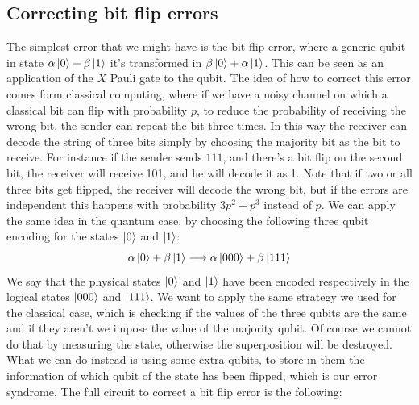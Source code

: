 \documentclass{article}
\begin{document}
	\subsection{Correcting bit flip errors}
	The simplest error that we might have is the bit flip error, where a generic qubit in state $\alpha\ket{0} + \beta\ket{1}$ it's transformed in $\beta\ket{0} + \alpha\ket{1}$. This can be seen as an application of the $X$ Pauli gate to the qubit. The idea of how to correct this error comes form classical computing, where if we have a noisy channel on which a classical bit can flip with probability $p$, to reduce the probability of receiving the wrong bit, the sender can repeat the bit three times. In this way the receiver can decode the string of three bits simply by choosing the majority bit as the bit to receive. For instance if the sender sends $111$, and there's a bit flip on the second bit, the receiver will receive 101, and he will decode it as 1. Note that if two or all three bits get flipped, the receiver will decode the wrong bit, but if the errors are independent this happens with probability $3p^2 + p^3$ instead of $p$. We can apply the same idea in the quantum case, by choosing the following three qubit encoding for the states $\ket{0}$ and $\ket{1}$:
	\[ \alpha\ket{0} + \beta\ket{1} \longrightarrow \alpha\ket{000} + \beta\ket{111}\]
	We say that the physical states $\ket{0}$ and $\ket{1}$ have been encoded respectively in the logical states $\ket{000}$ and $\ket{111}$. We want to apply the same strategy we used for the classical case, which is checking if the values of the three qubits are the same and if they aren't we impose the value of the majority qubit. Of course we cannot do that by measuring the state, otherwise the superposition will be destroyed. What we can do instead is using some extra qubits, to store in them the information of which qubit of the state has been flipped, which is our error syndrome. The full circuit to correct a bit flip error is the following:
\end{document}
